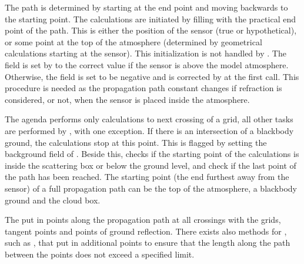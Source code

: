 The path is determined by starting at the end point and moving
backwards to the starting point. The calculations are initiated by
filling  with the practical end point of the
path. This is either the position of the sensor (true or
hypothetical), or some point at the top of the atmosphere (determined
by geometrical calculations starting at the sensor). This
initialization is not handled by . 
The field  is set by 
to the correct value if the sensor is above the model atmosphere.
Otherwise, the field is set to be negative and is corrected by
 at the first call. This procedure is
needed as the propagation path constant changes if refraction is
considered, or not, when the sensor is placed inside the atmosphere.

The agenda performs only calculations to next crossing of a grid, all
other tasks are performed by , with one exception.
If there is an intersection of a blackbody ground, the calculations
stop at this point. This is flagged by setting the background field of
. Beside this,  checks
if the starting point of the calculations is inside the scattering box
or below the ground level, and check if the last point of the path has
been reached. The starting point (the end furthest away from the
sensor) of a full propagation path can be the top of the atmosphere, a
blackbody ground and the cloud box.

The  put in points along the
propagation path at all crossings with the grids, tangent points and
points of ground reflection. There exists also methods for
, such as
, that put in additional
points to ensure that the length along the path between the points
does not exceed a specified limit.



\label{sec:ppath:Ppath}

